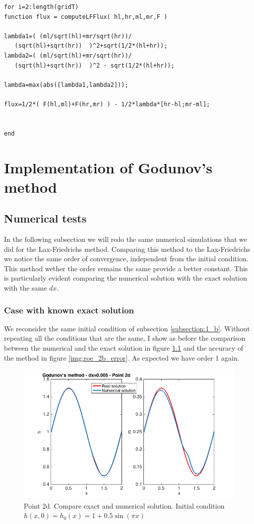 \documentclass[oneside,12pt]{book}  %
\theoremstyle{plain}
\theoremstyle{definition}
\theoremstyle{remark}
\numberwithin{equation}{chapter} %
\begin{document}
\begin{lstlisting}[frame=single]for i=2:length(gridT)
function flux = computeLFFlux( hl,hr,ml,mr,F )

lambda1=( (ml/sqrt(hl)+mr/sqrt(hr))/
   (sqrt(hl)+sqrt(hr))  )^2+sqrt(1/2*(hl+hr));
lambda2=( (ml/sqrt(hl)+mr/sqrt(hr))/
   (sqrt(hl)+sqrt(hr))  )^2 - sqrt(1/2*(hl+hr));

lambda=max(abs([lambda1,lambda2]));

flux=1/2*( F(hl,ml)+F(hr,mr) ) - 1/2*lambda*[hr-hl;mr-ml];


end
\end{lstlisting}

\chapter{Implementation of Godunov's method}
\label{chap:2}

\section{Numerical tests}
In the following subsection we will redo the same numerical
simulations that we did for the Lax-Friedrichs method.
Comparing this method to the Lax-Friedrichs we notice the same order
of convergence, independent from the initial condition. This method
wether the order remains the same provide a better constant. This is
particularly evident comparing the numerical solution with the exact
solution with the same $dx$. 

\subsection{Case with known exact solution}
We reconsider the same initial condition of subsection
\ref{subsection:1_b}. Without repeating all the conditions that are
the same, I show as before the comparison between the numerical and
the exact solution in figure \ref{img:roe_2b_solution} and the
accuracy of the method in figure \ref{img:roe_2b_error}. As expected we have
order 1 again.

\begin{figure}[h]
\label{img:roe_2b_solution}
\centering
\includegraphics[scale=0.5]{Immagini/LF/2b-solution.png}
\caption{Point 2d. Compare exact and numerical solution. Initial
  condition $h(x,0)=h_0(x)=1+0.5\sin(\pi x)$}
\end{figure}
\end{document}
